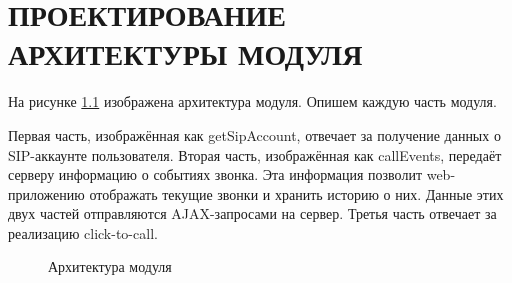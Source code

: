 \chapter{ПРОЕКТИРОВАНИЕ АРХИТЕКТУРЫ МОДУЛЯ}

На рисунке \ref{image:architecture} изображена архитектура модуля. Опишем каждую часть модуля.

Первая часть, изображённая как getSipAccount, отвечает за получение данных о SIP-аккаунте пользователя. Вторая часть, изображённая как callEvents, передаёт серверу информацию о событиях звонка. Эта информация позволит web-приложению отображать текущие звонки и хранить историю о них. Данные этих двух частей отправляются AJAX-запросами на сервер. Третья часть отвечает за реализацию click-to-call.

\begin{figure}[h!]
\caption{Архитектура модуля}
\label{image:architecture}
\end{figure}




